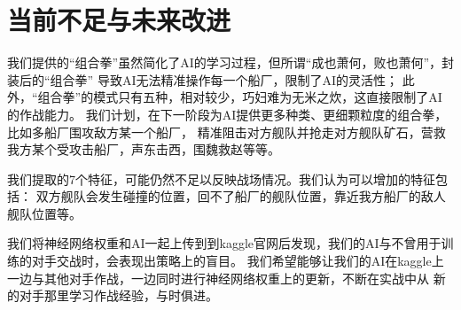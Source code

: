 \documentclass[10pt]{article}
\begin{document}
\section{当前不足与未来改进}
我们提供的“组合拳”虽然简化了AI的学习过程，但所谓“成也萧何，败也萧何”，封装后的“组合拳”
导致AI无法精准操作每一个船厂，限制了AI的灵活性；
此外，“组合拳”的模式只有五种，相对较少，巧妇难为无米之炊，这直接限制了AI的作战能力。
我们计划，在下一阶段为AI提供更多种类、更细颗粒度的组合拳，比如多船厂围攻敌方某一个船厂，
精准阻击对方舰队并抢走对方舰队矿石，营救我方某个受攻击船厂，声东击西，围魏救赵等等。

我们提取的7个特征，可能仍然不足以反映战场情况。我们认为可以增加的特征包括：
双方舰队会发生碰撞的位置，回不了船厂的舰队位置，靠近我方船厂的敌人舰队位置等。

我们将神经网络权重和AI一起上传到到kaggle官网后发现，我们的AI与不曾用于训练的对手交战时，会表现出策略上的盲目。
我们希望能够让我们的AI在kaggle上一边与其他对手作战，一边同时进行神经网络权重上的更新，不断在实战中从
新的对手那里学习作战经验，与时俱进。
\end{document}
